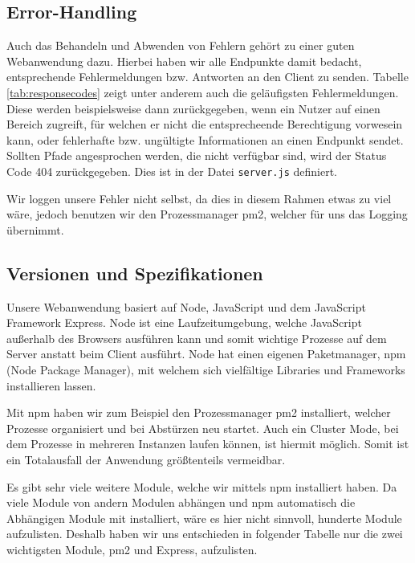 \subsection{Error-Handling}
\label{sec:nodechapter-error-handling}
Auch das Behandeln und Abwenden von Fehlern gehört zu einer guten Webanwendung dazu. Hierbei haben
wir alle Endpunkte damit bedacht, entsprechende Fehlermeldungen bzw. Antworten an den Client zu senden.
Tabelle \ref{tab:responsecodes} zeigt unter anderem auch die geläufigsten Fehlermeldungen. Diese werden
beispielsweise dann zurückgegeben, wenn ein Nutzer auf einen Bereich zugreift, für welchen
er nicht die entsprecheende Berechtigung vorwesein kann, oder fehlerhafte bzw. ungültigte Informationen an
einen Endpunkt sendet. Sollten Pfade angesprochen werden, die nicht verfügbar sind, wird der Status Code 404
zurückgegeben. Dies ist in der Datei \verb|server.js| definiert.

Wir loggen unsere Fehler nicht selbst, da dies in diesem Rahmen
etwas zu viel wäre, jedoch benutzen wir den Prozessmanager pm2, welcher für uns das Logging übernimmt.


\subsection{Versionen und Spezifikationen}
\label{sec:nodechapter-versions}
Unsere Webanwendung basiert auf Node, JavaScript und dem JavaScript Framework Express. Node ist eine Laufzeitumgebung,
welche JavaScript außerhalb des Browsers ausführen kann und somit wichtige Prozesse auf dem Server anstatt beim Client ausführt.
Node hat einen eigenen Paketmanager, npm (Node Package Manager), mit welchem sich vielfältige Libraries und Frameworks installieren lassen.

Mit npm haben wir zum Beispiel den Prozessmanager pm2 installiert, welcher Prozesse organisiert und bei Abstürzen
neu startet. Auch ein Cluster Mode, bei dem Prozesse in mehreren Instanzen laufen können, ist hiermit möglich. Somit
ist ein Totalausfall der Anwendung größtenteils vermeidbar.

Es gibt sehr viele weitere Module, welche wir mittels npm installiert haben. Da viele Module von andern Modulen abhängen
und npm automatisch die Abhängigen Module mit installiert, wäre es hier nicht sinnvoll, hunderte Module aufzulisten.
Deshalb haben wir uns entschieden in folgender Tabelle nur die zwei wichtigsten Module, pm2 und Express, aufzulisten.

